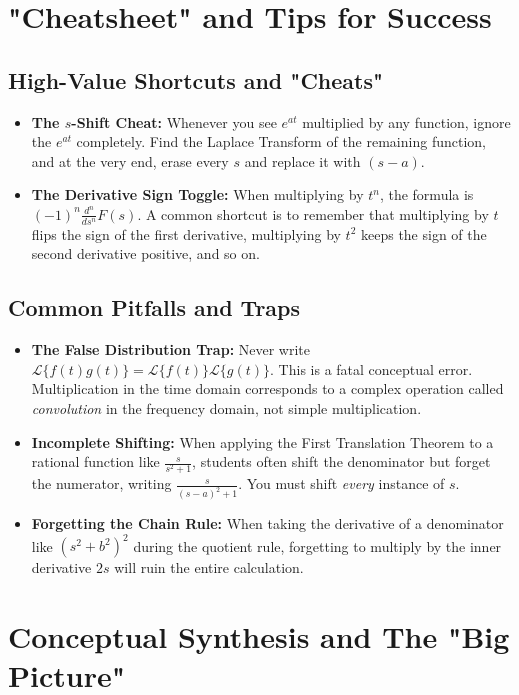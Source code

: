 \documentclass[11pt, a4paper]{article}
\theoremstyle{definition}
\theoremstyle{remark}
\begin{document}
\section{"Cheatsheet" and Tips for Success}

\subsection{High-Value Shortcuts and "Cheats"}
\begin{itemize}
    \item \textbf{The $s$-Shift Cheat:} Whenever you see $e^{at}$ multiplied by any function, ignore the $e^{at}$ completely. Find the Laplace Transform of the remaining function, and at the very end, erase every $s$ and replace it with $(s-a)$.
    \item \textbf{The Derivative Sign Toggle:} When multiplying by $t^n$, the formula is $(-1)^n \frac{d^n}{ds^n} F(s)$. A common shortcut is to remember that multiplying by $t$ flips the sign of the first derivative, multiplying by $t^2$ keeps the sign of the second derivative positive, and so on.
\end{itemize}

\subsection{Common Pitfalls and Traps}
\begin{itemize}
    \item \textbf{The False Distribution Trap:} Never write $\mathscr{L}\{f(t)g(t)\} = \mathscr{L}\{f(t)\} \mathscr{L}\{g(t)\}$. This is a fatal conceptual error. Multiplication in the time domain corresponds to a complex operation called \textit{convolution} in the frequency domain, not simple multiplication.
    \item \textbf{Incomplete Shifting:} When applying the First Translation Theorem to a rational function like $\frac{s}{s^2+1}$, students often shift the denominator but forget the numerator, writing $\frac{s}{(s-a)^2+1}$. You must shift \textit{every} instance of $s$.
    \item \textbf{Forgetting the Chain Rule:} When taking the derivative of a denominator like $(s^2+b^2)^2$ during the quotient rule, forgetting to multiply by the inner derivative $2s$ will ruin the entire calculation.
\end{itemize}

\newpage

\section{Conceptual Synthesis and The "Big Picture"}
\end{document}
